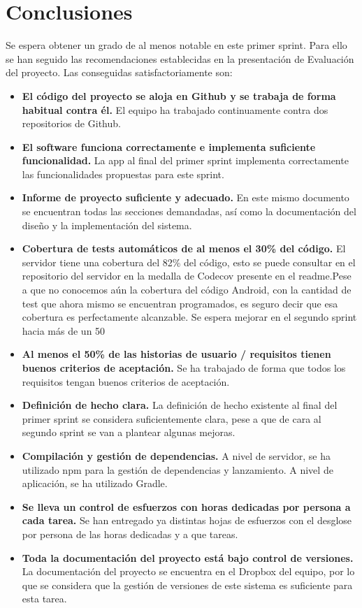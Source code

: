 \documentclass[11pt,a4paper]{report}
\begin{document}
\chapter{Conclusiones}
Se espera obtener un grado de al menos notable en este primer sprint. Para ello se han seguido las recomendaciones establecidas en la presentación de Evaluación del proyecto. Las conseguidas satisfactoriamente son:
\begin{itemize}
	\item \textbf{El código del proyecto se aloja en Github y se trabaja de forma habitual contra él.} El equipo ha trabajado continuamente contra dos repositorios de Github.
	\item \textbf{El software funciona correctamente e implementa suficiente funcionalidad.} La app al final del primer sprint implementa correctamente las funcionalidades propuestas para este sprint.
	\item \textbf{Informe de proyecto suficiente y adecuado.} En este mismo documento se encuentran todas las secciones demandadas, así como la documentación del diseño y la implementación del sistema.
	\item \textbf{Cobertura de tests automáticos de al menos el 30\% del código.} El servidor tiene una cobertura del 82\% del código, esto se puede consultar en el repositorio del servidor en la medalla de Codecov presente en el readme.Pese a que no conocemos aún la cobertura del código Android, con la cantidad de test que ahora mismo se encuentran programados, es seguro decir que esa cobertura es perfectamente alcanzable. Se espera mejorar en el segundo sprint hacia más de un 50%
	\item \textbf{Al menos el 50\% de las historias de usuario / requisitos tienen buenos criterios de aceptación.} Se ha trabajado de forma que todos los requisitos tengan buenos criterios de aceptación.
	\item \textbf{Definición de hecho clara.} La definición de hecho existente al final del primer sprint se considera suficientemente clara, pese a que de cara al segundo sprint se van a plantear algunas mejoras.
	\item \textbf{Compilación y gestión de dependencias.} A nivel de servidor, se ha utilizado npm para la gestión de dependencias y lanzamiento. A nivel de aplicación, se ha utilizado Gradle.
	\item \textbf{Se lleva un control de esfuerzos con horas dedicadas por persona a cada tarea.} Se han entregado ya distintas hojas de esfuerzos con el desglose por persona de las horas dedicadas y a que tareas.
	\item \textbf{Toda la documentación del proyecto está bajo control de versiones.} La documentación del proyecto se encuentra en el Dropbox del equipo, por lo que se considera que la gestión de versiones de este sistema es suficiente para esta tarea.
\end{itemize}
\end{document}
